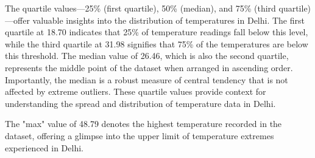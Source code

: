 \documentclass[sn-mathphys,Numbered]{sn-jnl}
\theoremstyle{thmstyleone}
\theoremstyle{thmstyletwo}
\theoremstyle{thmstylethree}
\begin{document}
The quartile values—25\% (first quartile), 50\% (median), and 75\% (third quartile)—offer valuable insights into the distribution of temperatures in Delhi. The first quartile at 18.70 indicates that 25\% of temperature readings fall below this level, while the third quartile at 31.98 signifies that 75\% of the temperatures are below this threshold. The median value of 26.46, which is also the second quartile, represents the middle point of the dataset when arranged in ascending order. Importantly, the median is a robust measure of central tendency that is not affected by extreme outliers. These quartile values provide context for understanding the spread and distribution of temperature data in Delhi.

The "max" value of 48.79 denotes the highest temperature recorded in the dataset, offering a glimpse into the upper limit of temperature extremes experienced in Delhi.
\end{document}
